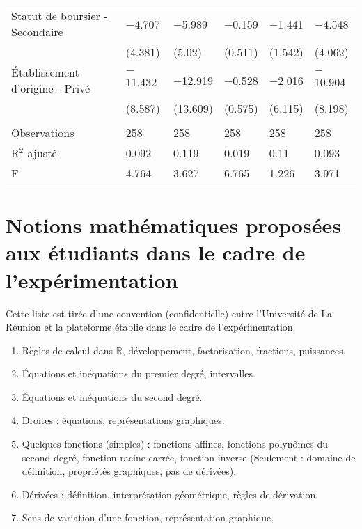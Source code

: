 \documentclass[
]{book}
\providecommand{\tightlist}{%
  \setlength{\itemsep}{0pt}\setlength{\parskip}{0pt}}
\begin{document}
\begin{ThreePartTable}
\begin{longtable}[t]{llllll}
Statut de boursier - Secondaire & $-$4.707 & $-$5.989 & $-$0.159 & $-$1.441 & $-$4.548\\
 & (4.381) & (5.02) & (0.511) & (1.542) & (4.062)\\
Établissement d'origine - Privé & $-$11.432 & $-$12.919 & $-$0.528 & $-$2.016 & $-$10.904\\
 & (8.587) & (13.609) & (0.575) & (6.115) & (8.198)\\
 &  &  &  &  & \\
Observations & 258 & 258 & 258 & 258 & 258\\
R$^2$ ajusté & 0.092 & 0.119 & 0.019 & 0.11 & 0.093\\
F & 4.764 & 3.627 & 6.765 & 1.226 & 3.971\\*
\end{longtable}
\end{ThreePartTable}
\endgroup{}

\newpage

\setcounter{table}{0}
\setcounter{figure}{0}

\hypertarget{g20notions}{%
\section{Notions mathématiques proposées aux étudiants dans le cadre de l'expérimentation}\label{g20notions}}

Cette liste est tirée d'une convention (confidentielle) entre l'Université de La Réunion et la plateforme établie dans le cadre de l'expérimentation.

\begin{enumerate}
\def\labelenumi{\arabic{enumi}.}
\tightlist
\item
  Règles de calcul dans \(\mathbb{R}\), développement, factorisation, fractions, puissances.
\item
  Équations et inéquations du premier degré, intervalles.
\item
  Équations et inéquations du second degré.
\item
  Droites : équations, représentations graphiques.
\item
  Quelques fonctions (simples) : fonctions affines, fonctions polynômes du second degré, fonction racine carrée, fonction inverse (Seulement : domaine de définition, propriétés graphiques, pas de dérivées).
\item
  Dérivées : définition, interprétation géométrique, règles de dérivation.
\item
  Sens de variation d'une fonction, représentation graphique.
\end{enumerate}
\end{document}
